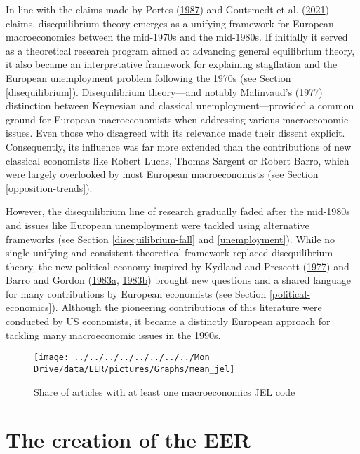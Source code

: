 \documentclass[
  12pt,
  onecolumn]{article}
\begin{document}
In line with the claims made by Portes
(\protect\hyperlink{ref-portes1987}{1987}) and Goutsmedt et al.
(\protect\hyperlink{ref-goutsmedt2021}{2021}) claims, disequilibrium
theory emerges as a unifying framework for European macroeconomics
between the mid-1970s and the mid-1980s. If initially it served as a
theoretical research program aimed at advancing general equilibrium
theory, it also became an interpretative framework for explaining
stagflation and the European unemployment problem following the 1970s
(see Section \ref{disequilibrium}). Disequilibrium theory---and notably
Malinvaud's (\protect\hyperlink{ref-malinvaud1977}{1977}) distinction
between Keynesian and classical unemployment---provided a common ground
for European macroeconomists when addressing various macroeconomic
issues. Even those who disagreed with its relevance made their dissent
explicit. Consequently, its influence was far more extended than the
contributions of new classical economists like Robert Lucas, Thomas
Sargent or Robert Barro, which were largely overlooked by most European
macroeconomists (see Section \ref{opposition-trends}).

However, the disequilibrium line of research gradually faded after the
mid-1980s and issues like European unemployment were tackled using
alternative frameworks (see Section \ref{disequilibrium-fall} and
\ref{unemployment}). While no single unifying and consistent theoretical
framework replaced disequilibrium theory, the new political economy
inspired by Kydland and Prescott
(\protect\hyperlink{ref-kydland1977}{1977}) and Barro and Gordon
(\protect\hyperlink{ref-barro1983}{1983a},
\protect\hyperlink{ref-barro1983c}{1983b}) brought new questions and a
shared language for many contributions by European economists (see
Section \ref{political-economics}). Although the pioneering
contributions of this literature were conducted by US economists, it
became a distinctly European approach for tackling many macroeconomic
issues in the 1990s.

\begin{figure}[h]

{\centering \texttt{[image: ../../../../../../../../Mon Drive/data/EER/pictures/Graphs/mean\_jel]} 

}

\caption{Share of articles with at least one macroeconomics JEL code}\label{fig:plot-jel}
\end{figure}

\hypertarget{EER-creation}{%
\section{The creation of the EER}\label{EER-creation}}
\end{document}
